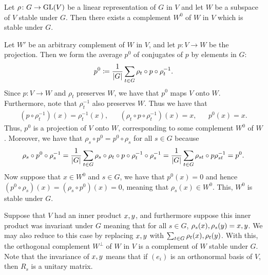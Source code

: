 \documentclass[letterpaper, 11pt, oneside]{book}
\begin{document}
\begin{thrm}\label{thrm:stable_complements_of_subspace}
  Let $\rho\colon G \to \operatorname{GL}(V)$ be a linear representation of $G$ in $V$ and let $W$ be a subspace of $V$ stable under $G$.
  Then there exists a complement $W^{0}$ of $W$ in $V$ which is stable under $G$.
\end{thrm}
\begin{pf}
  Let $W'$ be an arbitrary complement of $W$ in $V$, and let $p\colon V \to W$ be the projection.
  Then we form the average $p^{0}$ of conjugates of $p$ by elements in $G$:
  \[
    p^{0} \coloneqq \frac{1}{\abs{G}} \sum_{t \in G} \rho_{t} \circ p \circ \rho_{t}^{-1}.
  \]
  Since $p\colon V \to W$ and $\rho_{t}$ preserves $W$, we have that $p^{0}$ maps $V$ onto $W$.
  Furthermore, note that $\rho_{t}^{-1}$ also preserves $W$.
  \clearpage
  Thus we have that
  \begin{align*}
    (p \circ \rho_{t}^{-1})(x) = \rho_{t}^{-1}(x), && (\rho_{t} \circ p \circ \rho_{t}^{-1})(x) = x, && p^{0}(x) = x.
  \end{align*}
  Thus, $p^{0}$ is a projection of $V$ onto $W$, corresponding to some complement $W^{0}$ of $W$.
  Moreover, we have that $\rho_{s} \circ p^{0} = p^{0} \circ \rho_{s}$ for all $s \in G$ because
  \[
    \rho_{s} \circ p^{0} \circ \rho_{s}^{-1} = \frac{1}{\abs{G}} \sum_{t \in G} \rho_{s} \circ \rho_{t} \circ p \circ \rho_{t}^{-1} \circ \rho_{s}^{-1} = \frac{1}{\abs{G}} \sum_{t \in G} \rho_{st} \circ p \rho_{st}^{-1} = p^{0}.
  \]
  Now suppose that $x \in W^{0}$ and $s \in G$, we have that $p^{0}(x) = 0$ and hence $(p^{0} \circ \rho_{s})(x) = (\rho_{s} \circ p^{0})(x) = 0$, meaning that $\rho_{s}(x) \in W^{0}$.
  This, $W^{0}$ is stable under $G$.
\end{pf}

Suppose that $V$ had an inner product $\inner{x, y}$, and furthermore suppose this inner product was invariant under $G$ meaning that for all $s \in G$, $\inner{\rho_{s}(x), \rho_{s}(y)} = \inner{x, y}$.
We may also reduce to this case by replacing $\inner{x, y}$ with $\sum_{t \in G}\inner{\rho_{t}(x), \rho_{t}(y)}$.
With this, the orthogonal complement $W^{\bot}$ of $W$ in $V$ is a complement of $W$ stable under $G$.
Note that the invariance of $\inner{x, y}$ means that if $(e_{i})$ is an orthonormal basis of $V$, then $R_{s}$ is a unitary matrix.
\end{document}
